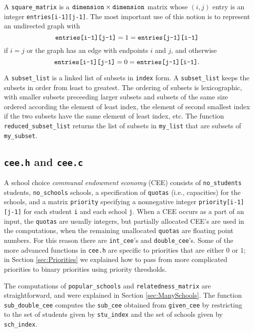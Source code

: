 \documentclass[12pt]{article}
\theoremstyle{definition}
\begin{document}
\begin{appendix}
A \texttt{square\_matrix} is a $\text{\texttt{dimension}} \times
\texttt{dimension}$ matrix whose $(i,j)$ entry is an integer
\texttt{entries[i-1][j-1]}.  The most important use of this notion is
to represent an undirected graph with
$$\text{\texttt{entries[i-1][j-1]}} = 1 =
\text{\texttt{entries[j-1][i-1]}}$$ if $i = j$ or the graph has an
edge with endpoints $i$ and $j$, and otherwise
$$\text{\texttt{entries[i-1][j-1]}} = 0 =
\text{\texttt{entries[j-1][i-1]}}.$$

A \texttt{subset\_list} is a linked list of subsets in \texttt{index}
form.  A \texttt{subset\_list} keeps the subsets in order from least
to greatest.  The ordering of subsets is lexicographic, with smaller
subsets preceeding larger subsets and subsets of the same size ordered
according the element of least index, the element of second smallest
index if the two subsets have the same element of least index, etc.
The function \texttt{reduced\_subset\_list} returns the list of
subsets in \texttt{my\_list} that are subsets of \texttt{my\_subset}.

\subsection{\texttt{cee.h} and \texttt{cee.c}}

A school choice \emph{communal endowment economy} (CEE) consists of
\texttt{no\_students} students, \texttt{no\_schools} schools, a
specification of \texttt{quotas} (i.e., capacities) for the schools,
and a matrix \texttt{priority} specifying a nonnegative integer
\texttt{priority[i-1][j-1]} for each student \texttt{i} and each
school \texttt{j}.  When a CEE occurs as a part of an input, the
\texttt{quotas} are usually integers, but partially allocated CEE's
are used in the computations, when the remaining unallocated
\texttt{quotas} are floating point numbers.  For this reason there are
\texttt{int\_cee}'s and \texttt{double\_cee}'s.  Some of the more
advanced functions in \texttt{cee.h} are specific to priorities that
are either $0$ or $1$; in Section \ref{sec:Priorities} we explained
how to pass from more complicated priorities to binary priorities
using priority thresholds.

The computations of \texttt{popular\_schools} and
\texttt{relatedness\_matrix} are straightforward, and were explained
in Section \ref{sec:ManySchools}.  The function
\texttt{sub\_double\_cee} computes the \texttt{sub\_cee} obtained from
\texttt{given\_cee} by restricting to the set of students given by
\texttt{stu\_index} and the set of schools given by
\texttt{sch\_index}.


\end{appendix}
\end{document}

